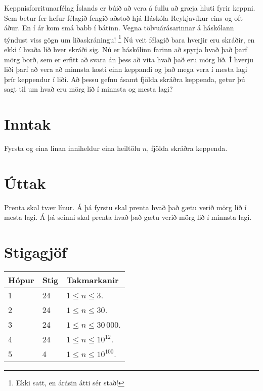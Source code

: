
Keppnisforritunarfélag Íslands er búið að vera á fullu að græja hluti fyrir keppni. 
Sem betur fer hefur félagið fengið aðstoð hjá Háskóla Reykjavíkur eins og oft áður.
En í ár kom smá babb í bátinn.
Vegna tölvuárásarinnar á háskólann týndust viss gögn um liðaskráningu!
\footnote{Ekki satt, en árásin átti sér stað!}
Nú veit félagið bara hverjir eru skráðir, en ekki í hvaða lið hver skráði sig.
Nú er háskólinn farinn að spyrja hvað það þarf mörg borð, 
sem er erfitt að svara án þess að vita hvað það eru mörg lið.
Í hverju liði þarf að vera að minnsta kosti einn keppandi og það mega vera í mesta lagi þrír keppendur í liði.
Að þessu gefnu ásamt fjölda skráðra keppenda,
getur þú sagt til um hvað eru mörg lið í minnsta og mesta lagi?

\section*{Inntak}
Fyrsta og eina línan inniheldur eina heiltölu $n$, fjölda skráðra keppenda.

\section*{Úttak}
Prenta skal tvær línur. 
Á þá fyrstu skal prenta hvað það gætu verið mörg lið í mesta lagi.
Á þá seinni skal prenta hvað það gætu verið mörg lið í minnsta lagi.

\section*{Stigagjöf}
\begin{tabular}{|l|l|l|}
\hline
Hópur & Stig & Takmarkanir \\ \hline
1     & 24   & $1 \leq n \leq 3$. \\ \hline
2     & 24   & $1 \leq n \leq 30$. \\ \hline
3     & 24   & $1 \leq n \leq 30\,000$. \\ \hline
4     & 24   & $1 \leq n \leq 10^{12}$. \\ \hline
5     & 4    & $1 \leq n \leq 10^{100}$. \\ \hline
\end{tabular}

